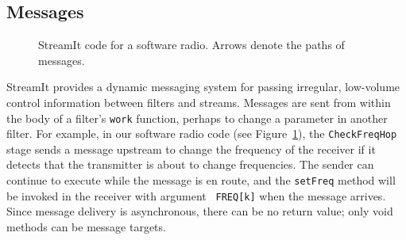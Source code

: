 \subsection{Messages}


\begin{figure}
\vspace{-12pt}
\vspace{-12pt}
\caption{StreamIt code for a software radio.  Arrows denote the paths of messages.\protect\label{fig:radiocode}}
\end{figure}


StreamIt provides a dynamic messaging system for passing irregular,
low-volume control information between filters and streams.  Messages
are sent from within the body of a filter's {\tt work} function, perhaps
to change a parameter in another filter.  For example, in our software
radio code (see Figure~\ref{fig:radiocode}), the {\tt CheckFreqHop}
stage sends a message upstream to change the frequency of the receiver
if it detects that the transmitter is about to change frequencies.  The
sender can continue to execute while the message is en route, and the
{\tt setFreq} method will be invoked in the receiver with argument {\tt
FREQ[k]} when the message arrives.  Since message delivery is
asynchronous, there can be no return value; only void methods can be
message targets.

